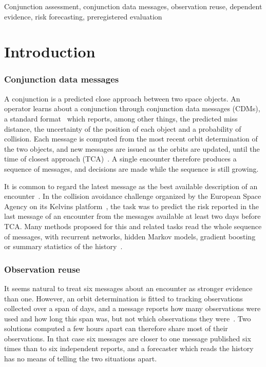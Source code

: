 \documentclass[conference]{IEEEtran}
\begin{document}
\begin{IEEEkeywords}
Conjunction assessment, conjunction data messages, observation reuse, dependent evidence, risk forecasting, preregistered evaluation
\end{IEEEkeywords}

\section{Introduction}\label{sec:intro}

\subsubsection*{Conjunction data messages}
A conjunction is a predicted close approach between two space objects. An operator learns about a conjunction through conjunction data messages (CDMs), a standard format~\cite{ccsds2013} which reports, among other things, the predicted miss distance, the uncertainty of the position of each object and a probability of collision. Each message is computed from the most recent orbit determination of the two objects, and new messages are issued as the orbits are updated, until the time of closest approach (TCA)~\cite{nasa2026}. A single encounter therefore produces a sequence of messages, and decisions are made while the sequence is still growing.

It is common to regard the latest message as the best available description of an encounter~\cite{pinto2020}. In the collision avoidance challenge organized by the European Space Agency on its Kelvins platform~\cite{uriot2022}, the task was to predict the risk reported in the last message of an encounter from the messages available at least two days before TCA. Many methods proposed for this and related tasks read the whole sequence of messages, with recurrent networks, hidden Markov models, gradient boosting or summary statistics of the history~\cite{catulo2023,pinto2020,tok2026,uriot2022,zerrouki2026}.

\subsubsection*{Observation reuse}
It seems natural to treat six messages about an encounter as stronger evidence than one. However, an orbit determination is fitted to tracking observations collected over a span of days, and a message reports how many observations were used and how long this span was, but not which observations they were~\cite{ccsds2013}. Two solutions computed a few hours apart can therefore share most of their observations. In that case six messages are closer to one message published six times than to six independent reports, and a forecaster which reads the history has no means of telling the two situations apart.
\end{document}

